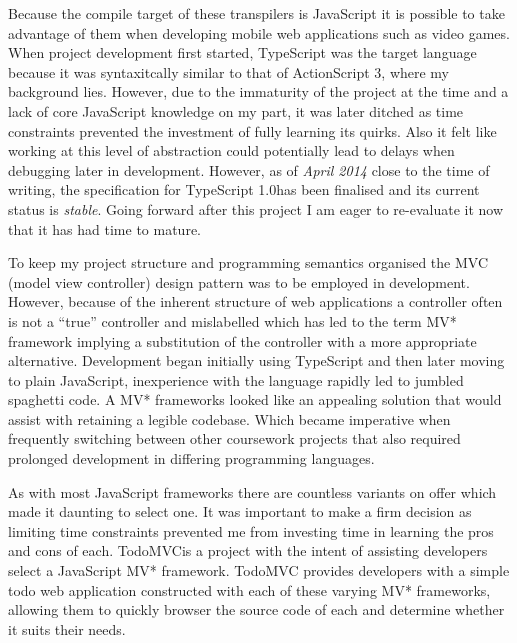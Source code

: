 \documentclass[final]{cmpreport}
\begin{document}
Because the compile target of these transpilers is JavaScript it is possible to take advantage of them when developing mobile web applications such as video games. When project development first started, TypeScript was the target language because it was syntaxitcally similar to that of ActionScript 3, where my background lies. However, due to the immaturity of the project at the time and a lack of core JavaScript knowledge on my part, it was later ditched as time constraints prevented the investment of fully learning its quirks. Also it felt like working at this level of abstraction could potentially lead to delays when debugging later in development. However, as of \textit{April 2014} close to the time of writing, the specification for TypeScript 1.0\footnotemark has been finalised and its current status is \textit{stable}. Going forward after this project I am eager to re-evaluate it now that it has had time to mature.




To keep my project structure and programming semantics organised the MVC (model view controller) design pattern was to be employed in development. However, because of the inherent structure of web applications a controller often is not a ``true'' controller and mislabelled which has led to the term MV* framework implying a substitution of the controller with a more appropriate alternative. Development began initially using TypeScript and then later moving to plain JavaScript, inexperience with the language rapidly led to jumbled spaghetti code. A MV* frameworks looked like an appealing solution that would assist with retaining a legible codebase.  Which became imperative when frequently switching between other coursework projects that also required prolonged development in differing programming languages.

As with most JavaScript frameworks there are countless variants on offer which made it daunting to select one. It was important to make a firm decision as limiting time constraints prevented me from investing time in learning the pros and cons of each. TodoMVC\footnotemark is a project with the intent of assisting developers select a JavaScript MV* framework. TodoMVC provides developers with a simple todo web application constructed with each of these varying MV* frameworks, allowing them to quickly browser the source code of each and determine whether it suits their needs.
\end{document}
